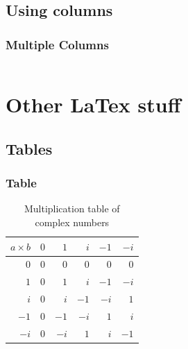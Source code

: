 \documentclass[aspectratio=169]{beamer}
\begin{document}
\subsection{Using columns}


\begin{frame}
\frametitle{Multiple Columns}
\begin{columns}[c] 



\end{columns}
\end{frame}



\section{Other LaTex stuff}

\subsection{Tables}


\begin{frame}
\frametitle{Table}


\begin{table} 
\caption{Multiplication table of complex numbers}
\begin{tabular}{r | r r r r r} 
$a \times b$ & $0$ &  $1$ &  $i$ & $-1$ & $-i$ \\ \hline
         $0$ & $0$ &  $0$ &  $0$ &  $0$ &  $0$ \\
         $1$ & $0$ &  $1$ &  $i$ & $-1$ & $-i$ \\
         $i$ & $0$ &  $i$ & $-1$ & $-i$ &  $1$ \\
        $-1$ & $0$ & $-1$ & $-i$ &  $1$ &  $i$ \\
        $-i$ & $0$ & $-i$ &  $1$ &  $i$ & $-1$ \\
\end{tabular}
\end{table}
\end{frame}
\end{document}
